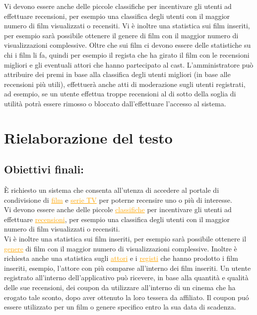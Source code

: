 \documentclass[a4paper,12pt]{report}
\begin{document}
	Vi devono essere anche delle piccole classifiche per incentivare gli utenti ad effettuare recensioni, per esempio una classifica degli utenti con il maggior numero di film visualizzati o recensiti. Vi è inoltre una statistica sui film inseriti, per esempio sarà possibile ottenere il genere di film con il maggior numero di visualizzazioni complessive. Oltre che sui film ci devono essere delle statistiche su chi i film li fa, quindi per esempio il regista che ha girato il film con le recensioni migliori e gli eventuali attori che hanno partecipato al cast. L'amministratore può attribuire dei premi in base alla classifica degli utenti migliori (in base alle recensioni più utili), effettuerà anche atti di moderazione sugli utenti registrati, ad esempio, se un utente effettua troppe recensioni al di sotto della soglia di utilità potrà essere rimosso o bloccato dall'effettuare l'accesso al sistema.
	\section{Rielaborazione del testo}
	\subsection{Obiettivi finali:}
	È richiesto un sistema che consenta all'utenza di accedere al portale di condivisione di \textcolor{orange}{\underline{film}} e \textcolor{orange}{\underline{serie TV}} per poterne recensire uno o più di interesse.\\
	Vi devono essere anche delle piccole \textcolor{orange}{\underline{classifiche}} per incentivare gli utenti ad effettuare \textcolor{orange}{\underline{recensioni}}, per esempio una classifica degli utenti con il maggior numero di film visualizzati o recensiti.\\ 
	Vi è inoltre una statistica sui film inseriti, per esempio sarà possibile ottenere il \textcolor{orange}{\underline{genere}} di film con il maggior numero di visualizzazioni complessive. Inoltre è richiesta anche una statistica sugli \textcolor{orange}{\underline{attori}} e i \textcolor{orange}{\underline{registi}} che hanno prodotto i film inseriti, esempio, l'attore con più comparse all'interno dei film inseriti.
	Un utente registrato all'interno dell'applicativo può ricevere, in base alla quantità e qualità delle sue recensioni, dei coupon da utilizzare all'interno di un cinema che ha erogato tale sconto, dopo aver ottenuto la loro tessera da affiliato. Il coupon puó essere utilizzato per un film o genere specifico entro la sua data di scadenza.
\end{document}
